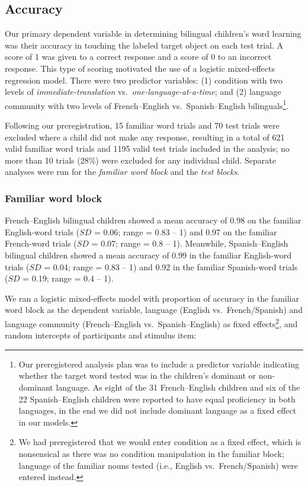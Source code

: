 \documentclass[
  man,floatsintext]{apa7}
\begin{document}
\hypertarget{accuracy}{%
\subsection{Accuracy}\label{accuracy}}

Our primary dependent variable in determining bilingual children's word learning was their accuracy in touching the labeled target object on each test trial. A score of 1 was given to a correct response and a score of 0 to an incorrect response. This type of scoring motivated the use of a logistic mixed-effects regression model. There were two predictor variables: (1) condition with two levels of \emph{immediate-translation} vs.~\emph{one-language-at-a-time}; and (2) language community with two levels of French--English vs.~Spanish--English bilinguals\footnote{Our preregistered analysis plan was to include a predictor variable indicating whether the target word tested was in the children's dominant or non-dominant language. As eight of the 31 French--English children and six of the 22 Spanish--English children were reported to have equal proficiency in both languages, in the end we did not include dominant language as a fixed effect in our models.}.

Following our preregistration, 15 familiar word trials and 70 test trials were excluded where a child did not make any response, resulting in a total of 621 valid familiar word trials and 1195 valid test trials included in the analysis; no more than 10 trials (28\%) were excluded for any individual child. Separate analyses were run for the \emph{familiar word block} and the \emph{test blocks}.

\hypertarget{familiar-word-block}{%
\subsubsection{Familiar word block}\label{familiar-word-block}}

French--English bilingual children showed a mean accuracy of 0.98 on the familiar English-word trials (\(SD\) = 0.06; range = 0.83 -- 1) and 0.97 on the familiar French-word trials (\(SD\) = 0.07; range = 0.8 -- 1). Meanwhile, Spanish--English bilingual children showed a mean accuracy of 0.99 in the familiar English-word trials (\(SD\) = 0.04; range = 0.83 -- 1) and 0.92 in the familiar Spanish-word trials (\(SD\) = 0.19; range = 0.4 -- 1).

We ran a logistic mixed-effects model with proportion of accuracy in the familiar word block as the dependent variable, language (English vs.~French/Spanish) and language community (French--English vs.~Spanish--English) as fixed effects\footnote{We had preregistered that we would enter condition as a fixed effect, which is nonsensical as there was no condition manipulation in the familiar block; language of the familiar nouns tested (i.e., English vs.~French/Spanish) were entered instead.}, and random intercepts of participants and stimulus item:
\end{document}
